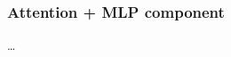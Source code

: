 \documentclass[11pt]{article}
\begin{document}
\subsubsection{\NEXT Attention + MLP component}


\dots
\end{document}
